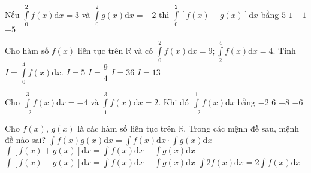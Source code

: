 \begin{ex}%
Nếu $\displaystyle\int\limits_0^2f(x)\mathrm{d}x=3$ và $\displaystyle\int\limits_0^2g(x)\mathrm{d}x=-2$ thì $\displaystyle\int\limits_0^2\left[f(x)-g(x)\right]\mathrm{d}x$ bằng
\choice
{\True $5$}
{$1$}
{$-1$}
{$-5$}
\end{ex}

\begin{ex}%
Cho hàm số $f(x)$ liên tục trên $\mathbb{R}$ và có $\displaystyle\int\limits_0^2f(x)\mathrm{d}x=9;\displaystyle\int\limits_2^4f(x)\mathrm{d}x=4$. Tính $I=\displaystyle\int\limits_0^4f(x)\mathrm{d}x$.
\choice
{$I=5$}
{$I=\dfrac{9}{4}$}
{$I=36$}
{\True $I=13$}
\end{ex}

\begin{ex}%
Cho $\displaystyle\int\limits_{-2}^3f(x)\mathrm{d}x=-4$ và $\displaystyle\int\limits_1^3f(x)\mathrm{d}x=2$. Khi đó $\displaystyle\int\limits_{-2}^1f(x)\mathrm{d}x$ bằng
\choice
{$-2$}
{$6$}
{$-8$}
{\True $-6$}
\end{ex}

\begin{ex}%
Cho $f(x)$, $g(x)$ là các hàm số liên tục trên $\mathbb{R}$. Trong các mệnh đề sau, mệnh đề nào sai?
\choice
{\True $\displaystyle\int f(x)g(x)\mathrm{d}x=\displaystyle\int{f(x)\mathrm{d}x\cdot\displaystyle\int{g(x)\mathrm{d}x}}$}
{$\displaystyle\int{\left[f(x)+g(x)\right]\mathrm{d}x=\displaystyle\int{f(x)\mathrm{d}x+\displaystyle\int{g(x)\mathrm{d}x}}}$}
{$\displaystyle\int{\left[f(x)-g(x)\right]\mathrm{d}x=\displaystyle\int{f(x)\mathrm{d}x-\displaystyle\int{g(x)\mathrm{d}x}}}$}
{$\displaystyle\int{2f(x)}\mathrm{d}x=2\displaystyle\int{f(x)\mathrm{d}}x$}
\end{ex}

